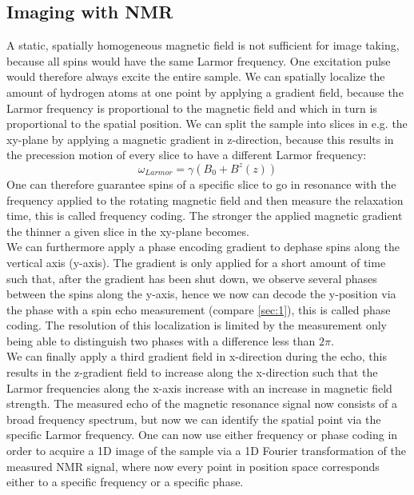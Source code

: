 \subsection{Imaging with NMR}
\label{sec:3}
A static, spatially homogeneous magnetic field is not sufficient for image taking, because all spins would have the same Larmor frequency. One excitation pulse would therefore always excite the entire sample. We can spatially localize the amount of hydrogen atoms at one point by applying a gradient field, because the Larmor frequency is proportional to the magnetic field and which in turn is proportional to the spatial position.
We can split the sample into slices in e.g. the xy-plane by applying a magnetic gradient in z-direction, because this results in the precession motion of every slice to have a different Larmor frequency:
\begin{equation}
	\omega _{Larmor} = \gamma \left(B_0+ B^z (z)\right)
	\label{eq:4}
\end{equation}
One can therefore guarantee spins of a specific slice to go in resonance with the frequency applied to the rotating magnetic field and then measure the relaxation time, this is called frequency coding. The stronger the applied magnetic gradient the thinner a given slice in the xy-plane becomes.\\
We can furthermore apply a phase encoding gradient to dephase spins along the vertical axis (y-axis). The gradient is only applied for a short amount of time such that, after the gradient has been shut down, we observe several phases between the spins along the y-axis, hence we now can decode the y-position via the phase with a spin echo measurement (compare \ref{sec:1}), this is called phase coding. The resolution of this localization is limited by the measurement only being able to distinguish two phases with a difference less than $2 \pi$.\\
We can finally apply a third gradient field in x-direction during the echo, this results in the z-gradient field to increase along the x-direction such that the Larmor frequencies along the x-axis increase with an increase in magnetic field strength. The measured echo of the magnetic resonance signal now consists of a broad frequency spectrum, but now we can identify the spatial point via the specific Larmor frequency. One can now use either frequency or phase coding in order to acquire a 1D image of the sample via a 1D Fourier transformation of the measured NMR signal, where now every point in position space corresponds either to a specific frequency or a specific phase.\\
